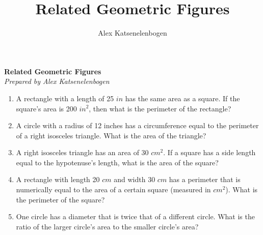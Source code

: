 \documentclass{article}
\title{Related Geometric Figures}
\author{Alex Katsenelenbogen}
\begin{document}
\begin{center}
      \Large\textbf{Related Geometric Figures}\\
      \large\textit{Prepared by Alex Katsenelenbogen}
   \end{center}

\begin{enumerate}

\item
A rectangle with a length of 25 $in$ has the same area as a square. If the square's area is 200 $in^2$, then what is the perimeter of the rectangle?

\item 
A circle with a radius of 12 inches has a circumference equal to the perimeter of a right isosceles triangle. What is the area of the triangle?

\item
A right isosceles triangle has an area of 30 $cm^2$. If a square has a side length equal to the hypotenuse's length, what is the area of the square?

\item 
A rectangle with length 20 $cm$ and width 30 $cm$ has a perimeter that is numerically equal to the area of a certain square (measured in $cm^2$). What is the perimeter of the square?

\item 
One circle has a diameter that is twice that of a different circle. What is the ratio of the larger circle's area to the smaller circle's area?

\end{enumerate}
\end{document}
